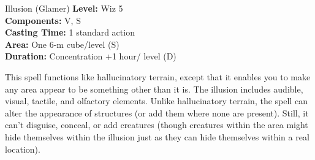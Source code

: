 {Illusion (Glamer)}
{
	\textbf{Level:}
	Wiz 5\\
	\textbf{Components:}
	V, S\\
	\textbf{Casting Time:}
	1 standard action\\
	\textbf{Area:}
	One 6-m cube/level (S)\\
	\textbf{Duration:}
	Concentration +1 hour/ level (D)\\
}
{
	This spell functions like hallucinatory terrain, except that it enables you to make any area appear to be something other than it is. The illusion includes audible, visual, tactile, and olfactory elements. Unlike hallucinatory terrain, the spell can alter the appearance of structures (or add them where none are present). Still, it can't disguise, conceal, or add creatures (though creatures within the area might hide themselves within the illusion just as they can hide themselves within a real location).

}

